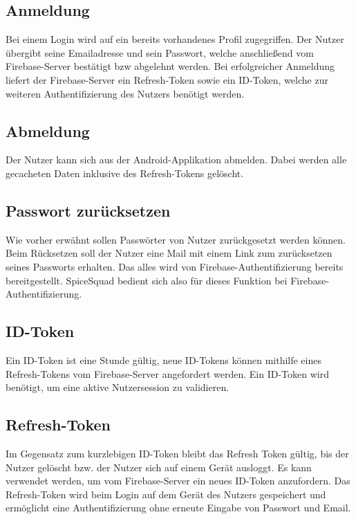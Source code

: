\documentclass{entwurfsheft}
\begin{document}
\subsection{Anmeldung}
Bei einem Login wird auf ein bereits vorhandenes Profil zugegriffen. Der Nutzer übergibt seine Emailadresse und sein Passwort, welche anschließend vom Firebase-Server bestätigt bzw abgelehnt werden. Bei erfolgreicher Anmeldung liefert der Firebase-Server ein Refresh-Token sowie ein ID-Token, welche zur weiteren Authentifizierung des Nutzers benötigt werden.

\subsection{Abmeldung}
Der Nutzer kann sich aus der Android-Applikation abmelden. Dabei werden alle gecacheten Daten inklusive des Refresh-Tokens gelöscht.

\subsection{Passwort zurücksetzen}
Wie vorher erwähnt sollen Passwörter von Nutzer zurückgesetzt werden können. Beim Rücksetzen soll der Nutzer eine Mail mit einem Link zum zurücksetzen seines Passworts erhalten.
Das alles wird von Firebase-Authentifizierung bereits bereitgestellt. SpiceSquad bedient sich also für dieses Funktion bei Firebase-Authentifizierung.

\subsection{ID-Token}
Ein ID-Token ist eine Stunde gültig, neue ID-Tokens können mithilfe eines Refresh-Tokens vom Firebase-Server angefordert werden. Ein ID-Token wird benötigt, um eine aktive Nutzersession zu validieren.

\subsection{Refresh-Token}
Im Gegensatz zum kurzlebigen ID-Token bleibt das Refresh Token gültig, bis der Nutzer gelöscht bzw. der Nutzer sich auf einem Gerät ausloggt. Es kann verwendet werden, um vom Firebase-Server ein neues ID-Token anzufordern. Das Refresh-Token wird beim Login auf dem Gerät des Nutzers gespeichert und ermöglicht eine Authentifizierung ohne erneute Eingabe von Passwort und Email. 
\end{document}
